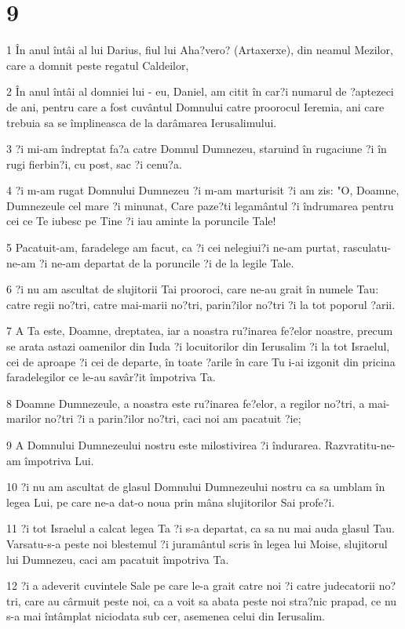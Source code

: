 \chapter{9}

\par 1 În anul întâi al lui Darius, fiul lui Aha?vero? (Artaxerxe), din neamul Mezilor, care a domnit peste regatul Caldeilor,
\par 2 În anul întâi al domniei lui - eu, Daniel, am citit în car?i numarul de ?aptezeci de ani, pentru care a fost cuvântul Domnului catre proorocul Ieremia, ani care trebuia sa se împlineasca de la darâmarea Ierusalimului.
\par 3 ?i mi-am îndreptat fa?a catre Domnul Dumnezeu, staruind în rugaciune ?i în rugi fierbin?i, cu post, sac ?i cenu?a.
\par 4 ?i m-am rugat Domnului Dumnezeu ?i m-am marturisit ?i am zis: "O, Doamne, Dumnezeule cel mare ?i minunat, Care paze?ti legamântul ?i îndrumarea pentru cei ce Te iubesc pe Tine ?i iau aminte la poruncile Tale!
\par 5 Pacatuit-am, faradelege am facut, ca ?i cei nelegiui?i ne-am purtat, rasculatu-ne-am ?i ne-am departat de la poruncile ?i de la legile Tale.
\par 6 ?i nu am ascultat de slujitorii Tai prooroci, care ne-au grait în numele Tau: catre regii no?tri, catre mai-marii no?tri, parin?ilor no?tri ?i la tot poporul ?arii.
\par 7 A Ta este, Doamne, dreptatea, iar a noastra ru?inarea fe?elor noastre, precum se arata astazi oamenilor din Iuda ?i locuitorilor din Ierusalim ?i la tot Israelul, cei de aproape ?i cei de departe, în toate ?arile în care Tu i-ai izgonit din pricina faradelegilor ce le-au savâr?it împotriva Ta.
\par 8 Doamne Dumnezeule, a noastra este ru?inarea fe?elor, a regilor no?tri, a mai-marilor no?tri ?i a parin?ilor no?tri, caci noi am pacatuit ?ie;
\par 9 A Domnului Dumnezeului nostru este milostivirea ?i îndurarea. Razvratitu-ne-am împotriva Lui.
\par 10 ?i nu am ascultat de glasul Domnului Dumnezeului nostru ca sa umblam în legea Lui, pe care ne-a dat-o noua prin mâna slujitorilor Sai profe?i.
\par 11 ?i tot Israelul a calcat legea Ta ?i s-a departat, ca sa nu mai auda glasul Tau. Varsatu-s-a peste noi blestemul ?i juramântul scris în legea lui Moise, slujitorul lui Dumnezeu, caci am pacatuit împotriva Ta.
\par 12 ?i a adeverit cuvintele Sale pe care le-a grait catre noi ?i catre judecatorii no?tri, care au cârmuit peste noi, ca a voit sa abata peste noi stra?nic prapad, ce nu s-a mai întâmplat niciodata sub cer, asemenea celui din Ierusalim.
